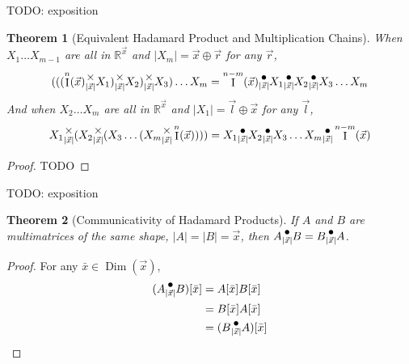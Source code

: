 \documentclass[12pt]{book}
\theoremstyle{plain}
\newtheorem{theorem}{Theorem}[chapter]
\theoremstyle{definition}
\theoremstyle{ppart}
\theoremstyle{case}
\theoremstyle{solution}
\DeclareMathOperator{\Dim}{Dim}
\DeclareMathOperator{\Ident}{I}
\newcommand{\mmult}[1]{\text{\raisebox{1ex}{$\underset{#1}{\times}$}}}
\newcommand{\dmult}[1]{\text{\raisebox{1ex}{$\underset{#1}{\,\bullet\,}$}}}
\newcommand{\shape}[1]{\left|#1\right|}
\begin{document}
TODO: exposition

\begin{theorem}[Equivalent Hadamard Product and Multiplication Chains]
When $X_1 \ldots X_{m-1}$ are all in $\mathbb{R}^{\vec{x}}$ and
$\shape{X_m} = \vec{x} \oplus \vec{r}$ for any $\vec{r}$,
\[
  (((\Ident^n(\vec{x})
  \mmult{\shape{\vec{x}}} X_1) \mmult{\shape{\vec{x}}} X_2) \mmult{\shape{\vec{x}}} X_3)
  \ldots X_m
  =
  \Ident^{n-m}(\vec{x})
  \dmult{\shape{\vec{x}}} X_1 \dmult{\shape{\vec{x}}} X_2 \dmult{\shape{\vec{x}}} X_3
  \ldots X_m
\]
And when $X_2 \ldots X_m$ are all in $\mathbb{R}^{\vec{x}}$ and
$\shape{X_1} = \vec{l} \oplus \vec{x}$ for any $\vec{l}$,
\[
  X_1 \mmult{\shape{\vec{x}}} (X_2 \mmult{\shape{\vec{x}}} (X_3
  \ldots (X_m \mmult{\shape{\vec{x}}} 
  \Ident^n(\vec{x}))))
  =
  X_1 \dmult{\shape{\vec{x}}} X_2 \dmult{\shape{\vec{x}}} X_3
  \ldots X_m \dmult{\shape{\vec{x}}} 
  \Ident^{n-m}(\vec{x})
\]
\end{theorem}
\begin{proof}
TODO 
\end{proof}

TODO: exposition

\begin{theorem}[Communicativity of Hadamard Products]
If $A$ and $B$ are multimatrices of the same shape, $\shape{A} = \shape{B} = \vec{x}$,
then $A \dmult{\shape{\vec{x}}} B = B \dmult{\shape{\vec{x}}} A$.
\end{theorem}
\begin{proof}
For any $\bar{x} \in \Dim(\vec{x})$,
\begin{align*}
(A \dmult{\shape{\vec{x}}} B)[\bar{x}]
  &= A[\bar{x}] B[\bar{x}] \\
  &= B[\bar{x}] A[\bar{x}] \\
  &= (B \dmult{\shape{\vec{x}}} A)[\bar{x}]
\end{align*}
\end{proof}
\end{document}
